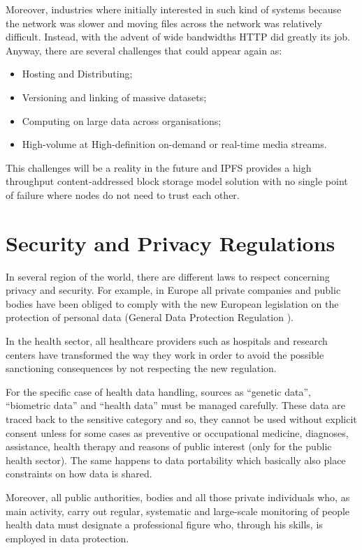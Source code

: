 \documentclass[preprint]{elsarticle}
\begin{document}
Moreover, industries where initially interested in such kind of systems because the network was slower and moving files across the network was relatively difficult. Instead, with the advent of wide bandwidths HTTP did greatly its job.
Anyway, there are several challenges that could appear again as:
\begin{itemize}
	\item Hosting and Distributing;
	\item Versioning and linking of massive datasets;
	\item Computing on large data across organisations;
	\item High-volume at High-definition on-demand or real-time media streams.
\end{itemize}
This challenges will be a reality in the future and IPFS provides a high throughput content-addressed block storage model solution with no single point of failure where nodes do not need to trust each other.

\section{Security and Privacy Regulations}
In several region of the world, there are different laws to respect concerning privacy and security. For example, in Europe all private companies and public bodies have been obliged to comply with the new European legislation on the protection of personal data (General Data Protection Regulation \cite{gdpr2016eu}). 

In the health sector, all healthcare providers such as hospitals and research centers have transformed the way they work in order to avoid the possible sanctioning consequences by not respecting the new regulation.

For the specific case of health data handling, sources as ``genetic data'', ``biometric data'' and ``health data'' must be managed carefully. These data are traced back to the sensitive category and so, they cannot be used without explicit consent unless for some cases as preventive or occupational medicine, diagnoses, assistance, health therapy and reasons of public interest (only for the public health sector). The same happens to data portability which basically also place constraints on how data is shared.

Moreover, all public authorities, bodies and all those private individuals who, as main activity, carry out regular, systematic and large-scale monitoring of people health data must designate a professional figure who, through his skills, is employed in data protection.
\end{document}
